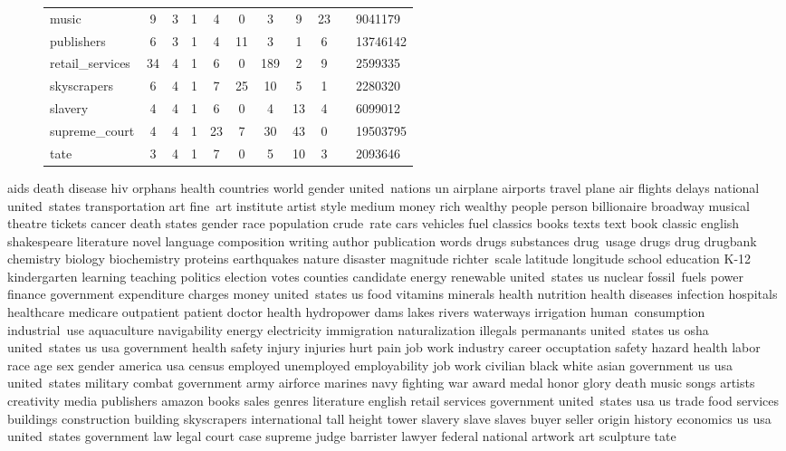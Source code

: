 \begin{figure*}
\begin{tabular}{ l | c c | c c c c c c |}
music & 9 & 3 & 1 & 4 & 0 & 3 & 9 & 23 &  & 9041179\\
publishers & 6 & 3 & 1 & 4 & 11 & 3 & 1 & 6 &  & 13746142\\
retail_services & 34 & 4 & 1 & 6 & 0 & 189 & 2 & 9 &  & 2599335\\
skyscrapers & 6 & 4 & 1 & 7 & 25 & 10 & 5 & 1 &  & 2280320\\
slavery & 4 & 4 & 1 & 6 & 0 & 4 & 13 & 4 &  & 6099012\\
supreme_court & 4 & 4 & 1 & 23 & 7 & 30 & 43 & 0 &  & 19503795\\
tate & 3 & 4 & 1 & 7 & 0 & 5 & 10 & 3 &  & 2093646\\
\end{tabular}
\end{figure*}

aids
death
disease
hiv
orphans
health
countries
world
gender
united~nations
un
airplane
airports
travel
plane
air
flights
delays
national
united~states
transportation
art
fine~art
institute
artist
style
medium
money
rich
wealthy
people
person
billionaire
broadway
musical
theatre
tickets
cancer
death
states
gender
race
population
crude~rate
cars
vehicles
fuel
classics
books
texts
text
book
classic
english
shakespeare
literature
novel
language
composition
writing
author
publication
words
drugs
substances
drug~usage
drugs
drug
drugbank
chemistry
biology
biochemistry
proteins
earthquakes
nature
disaster
magnitude
richter~scale
latitude
longitude
school
education
K-12
kindergarten
learning
teaching
politics
election
votes
counties
candidate
energy
renewable
united~states
us
nuclear
fossil~fuels
power
finance
government
expenditure
charges
money
united~states
us
food
vitamins
minerals
health
nutrition
health
diseases
infection
hospitals
healthcare
medicare
outpatient
patient
doctor
health
hydropower
dams
lakes
rivers
waterways
irrigation
human~consumption
industrial~use
aquaculture
navigability
energy
electricity
immigration
naturalization
illegals
permanants
united~states
us
osha
united~states
us
usa
government
health
safety
injury
injuries
hurt
pain
job
work
industry
career
occuptation
safety
hazard
health
labor
race
age
sex
gender
america
usa
census
employed
unemployed
employability
job
work
civilian
black
white
asian
government
us
usa
united~states
military
combat
government
army
airforce
marines
navy
fighting
war
award
medal
honor
glory
death
music
songs
artists
creativity
media
publishers
amazon
books
sales
genres
literature
english
retail
services
government
united~states
usa
us
trade
food
services
buildings
construction
building
skyscrapers
international
tall
height
tower
slavery
slave
slaves
buyer
seller
origin
history
economics
us
usa
united~states
government
law
legal
court
case
supreme
judge
barrister
lawyer
federal
national
artwork
art
sculpture
tate
